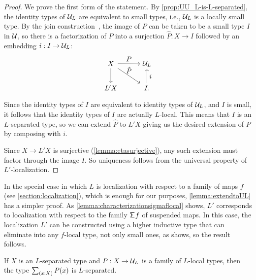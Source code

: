 \begin{proof}
    We prove the first form of the statement.
    By \cref{prop:UU_L-is-L-separated}, the identity types of $\mathcal{U}_L$ are
    equivalent to small types, i.e., $\mathcal{U}_L$ is a locally small type.
    By the join construction~\cite{joinconstruction}, the image of $P$
    can be taken to be a small type $I$ in $\mathcal{U}$, so there is a factorization
    of $P$ into a surjection $\hat{P} : X \to I$ followed by
    an embedding $i : I \to \mathcal{U}_L$:
    \[
        \begin{tikzpicture}
          \matrix (m) [matrix of math nodes,row sep=2em,column sep=3em,minimum width=2em]
          { X & \UU_L \\
            L' X & I. \\};
          \path[->]
            (m-1-1) edge node [above] {$P$} (m-1-2)
                    edge node [left] {} (m-2-1)
                    edge node [above] {$\hat{P}$} (m-2-2)
            (m-2-2) edge node [right] {$i$} (m-1-2)
            ;
        \end{tikzpicture}
    \]
    Since the identity types of $I$ are equivalent to identity types
    of $\mathcal{U}_L$, and $I$ is small, it follows that the identity types of $I$ are actually $L$-local.
    This means that $I$ is an $L$-separated type, so we can extend $\hat{P}$ to $L' X$ 
    giving us the desired extension of $P$ by composing with $i$.

    Since $X \to L'X$ is surjective (\cref{lemma:etasurjective}),
    any such extension must factor through the image $I$.
    So uniqueness follows from the universal property of $L'$-localization.
\end{proof}

\begin{rmk} 
    In the special case in which $L$ is localization with respect to a
    family of maps $f$ (see \cref{section:localization}),
    which is enough for our purposes, \cref{lemma:extendtoUL} has a simpler proof.
    As \cref{lemma:characterizationsigmaflocal} shows,
    $L'$ corresponds to localization with respect to the family $\mathsf{\Sigma}^{}{f}$
    of suspended maps.
    In this case, the localization $L'$ can be constructed using a higher inductive type
    that can eliminate into any $f$-local type, not only small ones, as \cite[Lemma 2.15]{RijkeShulmanSpitters} shows, so the result follows.
\end{rmk}

\begin{lem}\label{lemma:separatedpluslocalisseparated}
If $X$ is an $L$-separated type and $P:X\to \mathcal{U}_L$ is a family of $L$-local types, then the type
$\sm{x:X}P(x)$ is $L$-separated.
\end{lem}

